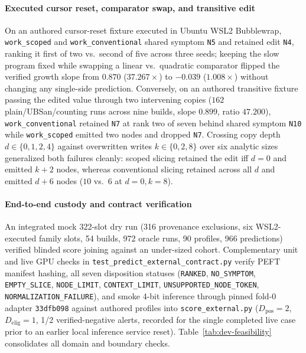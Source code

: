 \paragraph{Executed cursor reset, comparator swap, and transitive edit}
On an authored cursor-reset fixture executed in Ubuntu WSL2 Bubblewrap, \texttt{work\_scoped} and \texttt{work\_conventional} shared symptom \texttt{N5} and retained edit \texttt{N4}, ranking it first of two vs.\ second of five across three seeds; keeping the slow program fixed while swapping a linear vs.\ quadratic comparator flipped the verified growth slope from $0.870$ ($37.267\times$) to $-0.039$ ($1.008\times$) without changing any single-side prediction. Conversely, on an authored transitive fixture passing the edited value through two intervening copies ($162$ plain/UBSan/counting runs across nine builds, slope $0.899$, ratio $47.200$), \texttt{work\_conventional} retained \texttt{N7} at rank two of seven behind shared symptom \texttt{N10} while \texttt{work\_scoped} emitted two nodes and dropped \texttt{N7}. Crossing copy depth $d\in\{0,1,2,4\}$ against overwritten writes $k\in\{0,2,8\}$ over six analytic sizes generalized both failures cleanly: scoped slicing retained the edit iff $d=0$ and emitted $k+2$ nodes, whereas conventional slicing retained across all $d$ and emitted $d+6$ nodes ($10$ vs.\ $6$ at $d=0,k=8$).

\paragraph{End-to-end custody and contract verification}
An integrated mock 322-slot dry run (316 provenance exclusions, six WSL2-executed family slots, 54 builds, 972 oracle runs, 90 profiles, 966 predictions) verified blinded score joining against an under-sized cohort. Complementary unit and live GPU checks in \nolinkurl{test_predict_external_contract.py} verify PEFT manifest hashing, all seven disposition statuses (\nolinkurl{RANKED}, \nolinkurl{NO_SYMPTOM}, \nolinkurl{EMPTY_SLICE}, \nolinkurl{NODE_LIMIT}, \nolinkurl{CONTEXT_LIMIT}, \nolinkurl{UNSUPPORTED_NODE_TOKEN}, \nolinkurl{NORMALIZATION_FAILURE}), and smoke 4-bit inference through pinned fold-0 adapter \texttt{33dfb098} against authored profiles into \nolinkurl{score_external.py} ($D_{\mathrm{pos}}=2$, $D_{\mathrm{elig}}=1$, 1/2 verified-negative alerts, recorded for the single completed live case prior to an earlier local inference service reset). Table~\ref{tab:dev-feasibility} consolidates all domain and boundary checks.

